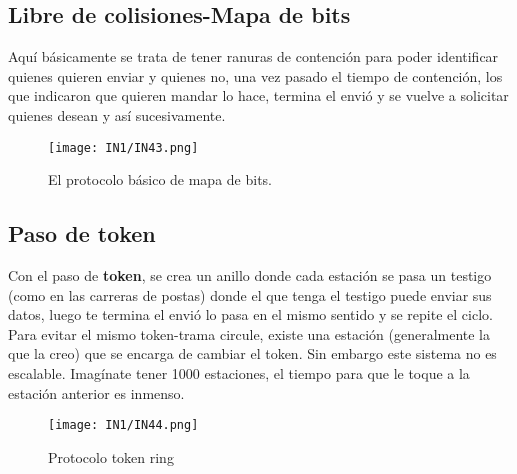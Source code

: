 \documentclass[
	12pt, %
	fleqn, %
	a4paper, %
]{LegrandOrangeBook}
\begin{document}
\subsection{Libre de colisiones-Mapa de bits}
Aquí básicamente se trata de tener ranuras de contención para poder identificar quienes quieren enviar y quienes no, una vez pasado el tiempo de contención, los que indicaron que quieren mandar lo hace, termina el envió y se vuelve a solicitar quienes desean y así sucesivamente.
\begin{figure}[H]
\centering
\texttt{[image: IN1/IN43.png]}
\caption{El protocolo básico de mapa de bits.}
\label{fig: mapa de bits}
\end{figure}
\subsection{Paso de token}
Con el paso de \textbf{token}, se crea un anillo donde cada estación se pasa un testigo (como en las carreras de postas) donde el que tenga el testigo puede enviar sus datos, luego te termina el envió lo pasa en el mismo sentido y se repite el ciclo. Para evitar el mismo token-trama circule, existe una estación (generalmente la que la creo) que se encarga de cambiar el token. Sin embargo este sistema no es escalable. Imagínate tener 1000 estaciones, el tiempo para que le toque a la estación anterior es inmenso.
\begin{figure}[H]
\centering
\texttt{[image: IN1/IN44.png]}
\caption{Protocolo token ring}
\label{fig:token ring}
\end{figure}
\end{document}
